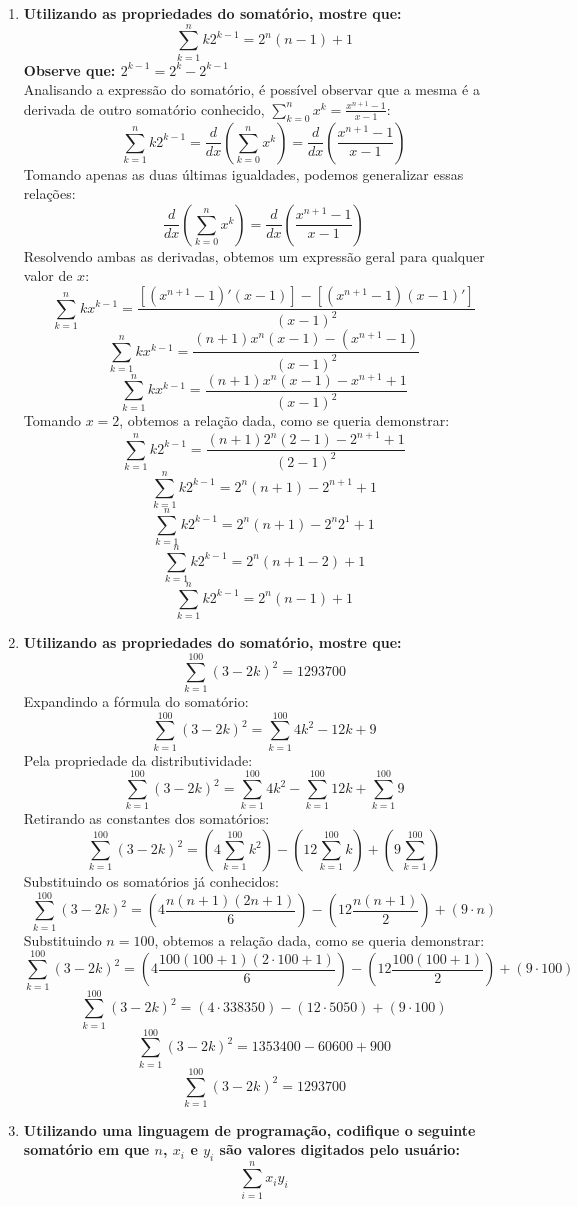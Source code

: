 \begin{enumerate}
	\item \textbf{Utilizando as propriedades do somatório, mostre que:}
	$$\sum_{k=1}^{n}k2^{k-1} = 2^n(n-1)+1$$
	\textbf{Observe que: $2^{k-1}=2^k-2^{k-1}$}\\
	Analisando a expressão do somatório, é possível observar que a mesma é a derivada de outro somatório conhecido, $\sum_{k=0}^{n} x^k = \frac{x^{n+1}-1}{x-1}$:
	$$\sum_{k=1}^{n}k2^{k-1} = \dfrac{d}{dx} \left(\sum_{k=0}^{n} x^k\right) = \dfrac{d}{dx} \left(\frac{x^{n+1}-1}{x-1}\right)$$
	Tomando apenas as duas últimas igualdades, podemos generalizar essas relações:
	$$\dfrac{d}{dx} \left(\sum_{k=0}^{n} x^k\right) = \dfrac{d}{dx} \left(\frac{x^{n+1}-1}{x-1}\right)$$
	Resolvendo ambas as derivadas, obtemos um expressão geral para qualquer valor de $x$:
	$$\sum_{k=1}^{n}kx^{k-1} = \frac{[(x^{n+1}-1)'(x-1)]-[(x^{n+1}-1)(x-1)']}{(x-1)^2}$$
	$$\sum_{k=1}^{n}kx^{k-1} = \frac{(n+1)x^n(x-1)-(x^{n+1}-1)}{(x-1)^2}$$
	$$\sum_{k=1}^{n}kx^{k-1} = \frac{(n+1)x^n(x-1)-x^{n+1}+1}{(x-1)^2}$$
	Tomando $x=2$, obtemos a relação dada, como se queria demonstrar:
	$$\sum_{k=1}^{n}k2^{k-1} = \frac{(n+1)2^n(2-1)-2^{n+1}+1}{(2-1)^2}$$
	$$\sum_{k=1}^{n}k2^{k-1} = 2^n(n+1)-2^{n+1}+1$$
	$$\sum_{k=1}^{n}k2^{k-1} = 2^n(n+1)-2^n2^1+1$$
	$$\sum_{k=1}^{n}k2^{k-1} = 2^n(n+1-2)+1$$
	$$\sum_{k=1}^{n}k2^{k-1} = 2^n(n-1)+1$$
	
	\item \textbf{Utilizando as propriedades do somatório, mostre que:}
	$$\sum_{k=1}^{100}(3-2k)^2 = 1293700$$
	Expandindo a fórmula do somatório:
	$$\sum_{k=1}^{100}(3-2k)^2 = \sum_{k=1}^{100}4k^2-12k+9$$
	Pela propriedade da distributividade:
	$$\sum_{k=1}^{100}(3-2k)^2 = \sum_{k=1}^{100}4k^2-\sum_{k=1}^{100}12k+\sum_{k=1}^{100}9$$
	Retirando as constantes dos somatórios:
	$$\sum_{k=1}^{100}(3-2k)^2 = \left(4\sum_{k=1}^{100}k^2\right) - \left(12\sum_{k=1}^{100}k\right) + \left(9\sum_{k=1}^{100}\right)$$
	Substituindo os somatórios já conhecidos:
	$$\sum_{k=1}^{100}(3-2k)^2 = \left(4\frac{n(n+1)(2n+1)}{6}\right) - \left(12\frac{n(n+1)}{2}\right) + \left(9\cdot n\right)$$
	Substituindo $n=100$, obtemos a relação dada, como se queria demonstrar:
	$$\sum_{k=1}^{100}(3-2k)^2 = \left(4\frac{100(100+1)(2\cdot 100+1)}{6}\right) - \left(12\frac{100(100+1)}{2}\right) + \left(9\cdot 100\right)$$
	$$\sum_{k=1}^{100}(3-2k)^2 = (4\cdot 338350) - (12 \cdot 5050) + (9\cdot 100)$$
	$$\sum_{k=1}^{100}(3-2k)^2 = 1353400 - 60600 + 900$$
	$$\sum_{k=1}^{100}(3-2k)^2 = 1293700$$
	
	\pagebreak
	\item \textbf{Utilizando uma linguagem de programação, codifique o seguinte somatório em que $n$, $x_i$ e $y_i$ são valores digitados pelo usuário:}
	$$\sum_{i=1}^{n}x_i y_i$$
	
	

\end{enumerate}
